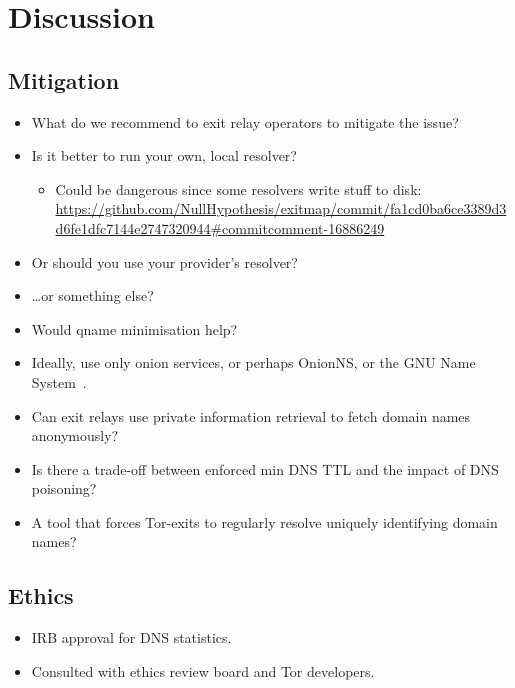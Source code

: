 \section{Discussion}
\label{sec:discussion}

\subsection{Mitigation}
\begin{itemize}
	\item What do we recommend to exit relay operators to mitigate the issue?
	\item Is it better to run your own, local resolver?
		\begin{itemize}
			\item Could be dangerous since some resolvers write stuff to disk:
		\url{https://github.com/NullHypothesis/exitmap/commit/fa1cd0ba6ce3389d3d6fe1dfc7144e2747320944#commitcomment-16886249}
		\end{itemize}
	\item Or should you use your provider's resolver?
	\item \ldots or something else?
	\item Would qname minimisation help?
	\item Ideally, use only onion services, or perhaps OnionNS, or the GNU Name
		System~\cite{Wachs2014a}.
	\item Can exit relays use private information retrieval to fetch domain
		names anonymously?
	\item Is there a trade-off between enforced min DNS TTL and the impact of
		DNS poisoning?
	\item A tool that forces Tor-exits to regularly resolve uniquely identifying
		domain names?
\end{itemize}

\subsection{Ethics}
\begin{itemize}
	\item IRB approval for DNS statistics.
	\item Consulted with ethics review board and Tor developers.
\end{itemize}
